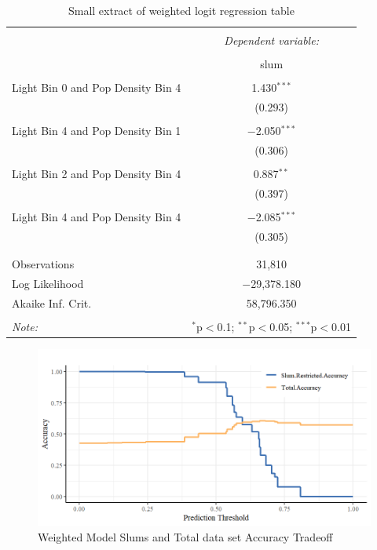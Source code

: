 \begin{table}[!htbp] \centering 
  \caption{Small extract of weighted logit regression table} 
  \label{} 
\begin{tabular}{@{\extracolsep{5pt}}lc} 
\\[-1.8ex]\hline 
\hline \\[-1.8ex] 
 & \multicolumn{1}{c}{\textit{Dependent variable:}} \\ 
\cline{2-2} 
\\[-1.8ex] & slum \\ 
\hline \\[-1.8ex]
 Light Bin 0 and Pop Density Bin 4 & 1.430$^{***}$ \\ 
  & (0.293) \\ 
  & \\ 
 Light Bin 4 and Pop Density Bin 1 & $-$2.050$^{***}$ \\ 
  & (0.306) \\ 
  & \\ 
 Light Bin 2 and Pop Density Bin 4 & 0.887$^{**}$ \\ 
  & (0.397) \\ 
  & \\ 
 Light Bin 4 and Pop Density Bin 4 & $-$2.085$^{***}$ \\ 
  & (0.305) \\ 
  & \\
\hline \\[-1.8ex] 
Observations & 31,810 \\ 
Log Likelihood & $-$29,378.180 \\ 
Akaike Inf. Crit. & 58,796.350 \\ 
\hline 
\hline \\[-1.8ex] 
\textit{Note:}  & \multicolumn{1}{r}{$^{*}$p$<$0.1; $^{**}$p$<$0.05; $^{***}$p$<$0.01} \\ 
\end{tabular} 
\end{table} 


\begin{figure}
    \centering
    \includegraphics[scale = 0.8]{Graphics/Weighted Slums and Total Dataset Accuracy Tradeoff.png}
    \caption{Weighted Model Slums and Total data set Accuracy Tradeoff}
    \label{fig:weightedModelTradeoff}
\end{figure}



